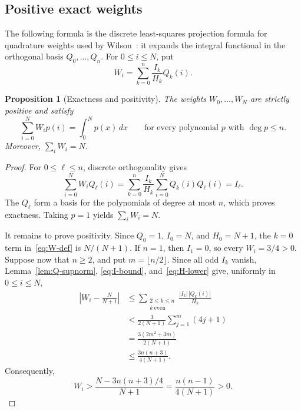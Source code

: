 \documentclass[11pt]{article}
\newtheorem{proposition}[theorem]{Proposition}
\theoremstyle{definition}
\theoremstyle{remark}
\begin{document}
\subsection{Positive exact weights}

The following formula is the discrete least-squares projection formula for
quadrature weights used by Wilson~\cite{wilson-least-squares}: it expands the
integral functional in the orthogonal basis \(Q_0,\ldots,Q_n\).
For \(0\leq i\leq N\), put
\begin{equation}\label{eq:W-def}
  W_i=\sum_{k=0}^n\frac{I_k}{H_k}Q_k(i).
\end{equation}

\begin{proposition}[Exactness and positivity]\label{prop:quadrature}
The weights \(W_0,\ldots,W_N\) are strictly positive and satisfy
\begin{equation}\label{eq:quadrature-N}
  \sum_{i=0}^NW_ip(i)=\int_0^Np(x)\,dx
  \qquad\text{for every polynomial \(p\) with \(\deg p\leq n\)}.
\end{equation}
Moreover, \(\sum_iW_i=N\).
\end{proposition}

\begin{proof}
For \(0\leq\ell\leq n\), discrete orthogonality gives
\[
  \sum_{i=0}^NW_iQ_\ell(i)
  =\sum_{k=0}^n\frac{I_k}{H_k}
    \sum_{i=0}^NQ_k(i)Q_\ell(i)
  =I_\ell.
\]
The \(Q_\ell\) form a basis for the polynomials of degree at most \(n\), which
proves exactness.  Taking \(p=1\) yields \(\sum_iW_i=N\).

It remains to prove positivity.  Since \(Q_0=1\), \(I_0=N\), and
\(H_0=N+1\), the \(k=0\) term in~\eqref{eq:W-def} is \(N/(N+1)\).
If \(n=1\), then \(I_1=0\), so every \(W_i=3/4>0\).  Suppose now that
\(n\geq2\), and put \(m=\lfloor n/2\rfloor\).  Since all odd \(I_k\) vanish,
Lemma~\ref{lem:Q-supnorm}, \eqref{eq:I-bound}, and~\eqref{eq:H-lower}
give, uniformly in \(0\leq i\leq N\),
\begin{align*}
  \left|W_i-\frac{N}{N+1}\right|
  &\leq \sum_{\substack{2\leq k\leq n\\ k\ \mathrm{even}}}
       \frac{|I_k|\,|Q_k(i)|}{H_k}\\
  &<\frac{3}{2(N+1)}\sum_{j=1}^{m}(4j+1)\\
  &=\frac{3(2m^2+3m)}{2(N+1)}\\
  &\leq\frac{3n(n+3)}{4(N+1)}.
\end{align*}
Consequently,
\[
  W_i>\frac{N-3n(n+3)/4}{N+1}
      =\frac{n(n-1)}{4(N+1)}>0.
\]
\end{proof}
\end{document}
